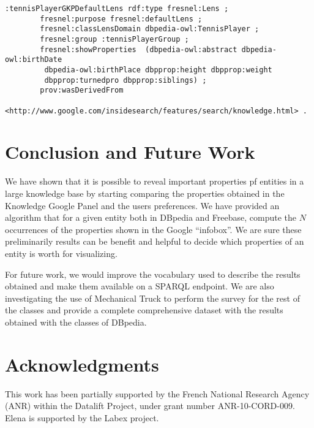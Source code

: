 \documentclass[runningheads,a4paper]{llncs}
\begin{document}
\begin{verbatim}
:tennisPlayerGKPDefaultLens rdf:type fresnel:Lens ;
		fresnel:purpose fresnel:defaultLens ;
		fresnel:classLensDomain dbpedia-owl:TennisPlayer ; 
		fresnel:group :tennisPlayerGroup ;
		fresnel:showProperties  (dbpedia-owl:abstract dbpedia-owl:birthDate
		 dbpedia-owl:birthPlace dbpprop:height dbpprop:weight 
		 dbpprop:turnedpro dbpprop:siblings) ;
		prov:wasDerivedFrom
		<http://www.google.com/insidesearch/features/search/knowledge.html> .		
\end{verbatim}	


\section{Conclusion and Future Work}
\label{sec:conclusion}
We have shown that it is possible to reveal important properties pf entities in a large knowledge base by starting comparing the properties obtained in the Knowledge Google Panel and the users preferences. We have provided an algorithm that for a given entity both in DBpedia and Freebase, compute the $N$ occurrences of the properties shown in the Google ``infobox''. We are sure these preliminarily results can be benefit and helpful to decide which properties of an entity is worth for visualizing.  

For future work, we would improve the vocabulary used to describe the results obtained and make them available on a SPARQL endpoint. We are also investigating the use of Mechanical Truck to perform the survey for the rest of the classes and provide a complete comprehensive dataset with the results obtained with the classes of DBpedia. 


\section*{Acknowledgments} \label{sec:acknowledgments}
This work has been partially supported by the French National Research Agency (ANR) within the Datalift Project, under grant number ANR-10-CORD-009. Elena is supported by the Labex project.



\nocite{*}

\end{document}
